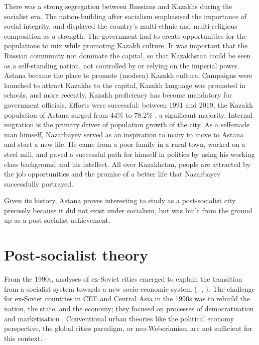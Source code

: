 \documentclass{article}
\begin{document}
There was a strong segregation between Russians and Kazakhs during the socialist era. The nation-building after socialism emphasised the importance of social integrity, and displayed the country's multi-ethnic and multi-religious composition as a strength. The government had to create opportunities for the populations to mix while promoting Kazakh culture. It was important that the Russian community not dominate the capital, so that Kazakhstan could be seen as a self-standing nation, not controlled by or relying on the imperial power. 
Astana became the place to promote (modern) Kazakh culture. 
Campaigns were launched to attract Kazakhs to the capital, Kazakh language was promoted in schools, and more recently, Kazakh proficiency has become mandatory for government officials. Efforts were successful: between 1991 and 2019, the Kazakh population of Astana surged from 44\% to 78.2\% \parencite{unfpa2020wekazakhstan}, a significant majority. 
Internal migration is the primary driver of population growth of the city. As a self-made man himself, Nazarbayev served as an inspiration to many to move to Astana and start a new life. He came from a poor family in a rural town, worked on a steel mill, and paved a successful path for himself in politics by using his working class background and his intellect. All over Kazakhstan, people are attracted by the job opportunities and the promise of a better life that Nazarbayev successfully portrayed.

Given its history, Astana proves interesting to study as a post-socialist city precisely because it did not exist under socialism, but was built from the ground up as a post-socialist achievement.

\section{Post-socialist theory}

From the 1990s, analyses of ex-Soviet cities emerged to explain the transition from a socialist system towards a new socio-economic system (\cite{smith1996socialist}, \cite{sailer1999characteristics}, \cite{TODO:required}). The challenge for ex-Soviet countries in CEE and Central Asia in the 1990s was to rebuild the nation, the state, and the economy; they focused on processes of democratisation and marketisation \parencite{ferenvcuhova2016introduction}. 
Conventional urban theories like the political economy perspective, the global cities paradigm, or neo-Weberianism \parencite{haussermann2005european} are not sufficient for this context.
\end{document}
